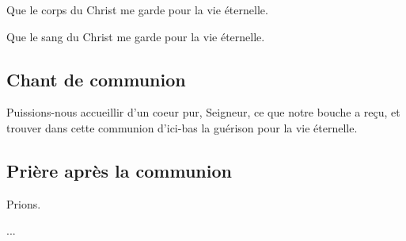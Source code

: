 Que le corps du Christ me garde pour la vie éternelle.

Que le sang du Christ me garde pour la vie éternelle.



\subsection{Chant de communion}


Puissions-nous accueillir d'un coeur pur, Seigneur, ce que notre
bouche a reçu, et trouver dans cette communion d'ici-bas la guérison
pour la vie éternelle.

\subsection{Prière après la communion}


Prions.

...

